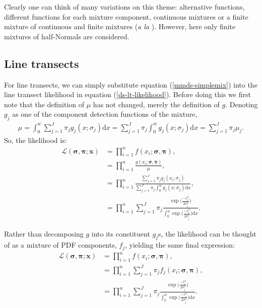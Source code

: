 Clearly one can think of many variations on this theme: alternative functions, different functions for each mixture component, continuous mixtures or a finite mixture of continuous and finite mixtures (\textit{a la} \cite{morgan08}). However, here only finite mixtures of half-Normals are considered.

\subsection{Line transects}
For line transects, we can simply substitute equation (\ref{mmds-simplemix}) into the line transect likelihood in equation (\ref{ds-lt-likelihood}). Before doing this we first note that the definition of $\mu$ has not changed, merely the definition of $g$. Denoting $g_j$ as one of the component detection functions of the mixture,
\begin{align*}
\mu = \int_0^w \sum_{j=1}^J \pi_j g_j(x;\sigma_j) \text{d}x = \sum_{j=1}^J \pi_j \int_0^w  g_j(x;\sigma_j) \text{d}x = \sum_{j=1}^J \pi_j \mu_j.
\end{align*}
So, the likelihood is:
\begin{align}
\mathcal{L}(\bm{\sigma}, \bm{\pi}; \bm{x}) &= \prod_{i=1}^n f(x_i;\bm{\sigma}, \bm{\pi}),\\
&= \prod_{i=1}^n \frac{g(x_i;\bm{\sigma}, \bm{\pi})}{\mu},\\
&= \prod_{i=1}^n \frac{\sum_{j=1}^J \pi_j g_j(x_i;\sigma_j)}{\sum_{j=1}^J \pi_j \int_0^w  g_j(x;\sigma_j) \text{d}x},\\
&= \prod_{i=1}^n \sum_{j=1}^J \pi_j \frac{\exp \Big( \frac{-x_i^2}{2 \sigma_j^2}\Big)}{\int_0^w \exp \Big( \frac{-x_i^2}{2 \sigma_j^2}\Big) \text{d}x}.
\label{mmds-lt-likelihood}
\end{align}


Rather than decomposing $g$ into its constituent $g_j$s, the likelihood can be thought of as a mixture of PDF components, $f_j$, yielding the same final expression:
\begin{align}
\mathcal{L}(\bm{\sigma}, \bm{\pi}; \bm{x}) &= \prod_{i=1}^n f(x_i;\bm{\sigma}, \bm{\pi}),\\
&= \prod_{i=1}^n \sum_{j=1}^J \pi_j f_j(x_i;\bm{\sigma}, \bm{\pi}),\\
&= \prod_{i=1}^n \sum_{j=1}^J \pi_j \frac{\exp \Big( \frac{-x_i^2}{2 \sigma_j^2}\Big)}{\int_0^w  \exp \Big( \frac{-x_i^2}{2 \sigma_j^2}\Big) \text{d}x}.
\label{mmds-lt-likelihood-pdf}
\end{align}

